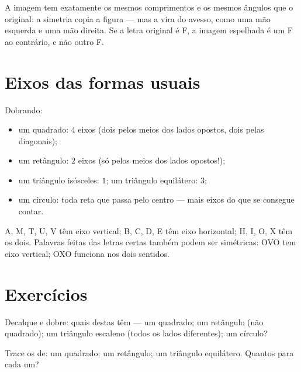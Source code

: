 \begin{example}\label{ex:g4:symmetry:properties}
A imagem tem exatamente os mesmos comprimentos e os mesmos ângulos
que o original: a simetria copia a figura --- mas a vira do avesso,
como uma mão esquerda e uma mão direita. Se a letra original é F, a
imagem espelhada é um F ao contrário, e não outro F.
\end{example}

\section{Eixos das formas usuais}

\begin{example}\label{ex:g4:symmetry:shapes}
Dobrando:
\begin{itemize}
  \item um quadrado: $4$ eixos (dois pelos meios dos lados opostos,
        dois pelas diagonais);
  \item um retângulo: $2$ eixos (só pelos meios dos lados opostos!);
  \item um triângulo isósceles: $1$; um triângulo equilátero: $3$;
  \item um círculo: toda reta que passa pelo centro --- mais eixos do
        que se consegue contar.
\end{itemize}
\end{example}

\begin{example}\label{ex:g4:symmetry:letters}
A, M, T, U, V têm eixo vertical; B, C, D, E têm eixo horizontal; H,
I, O, X têm os dois. Palavras feitas das letras certas também podem
ser simétricas: OVO tem eixo vertical; OXO funciona nos dois
sentidos.
\end{example}

\section{Exercícios}

\begin{exercise}[$\star$]\label{exo:g4:symmetry:1}
Decalque e dobre: quais destas têm  --- um quadrado;
um retângulo (não quadrado); um triângulo escaleno (todos os lados
diferentes); um círculo?
\end{exercise}

\begin{exercise}[$\star$]\label{exo:g4:symmetry:2}
Trace os  de: um quadrado; um retângulo; um
triângulo equilátero. Quantos para cada um?
\end{exercise}

